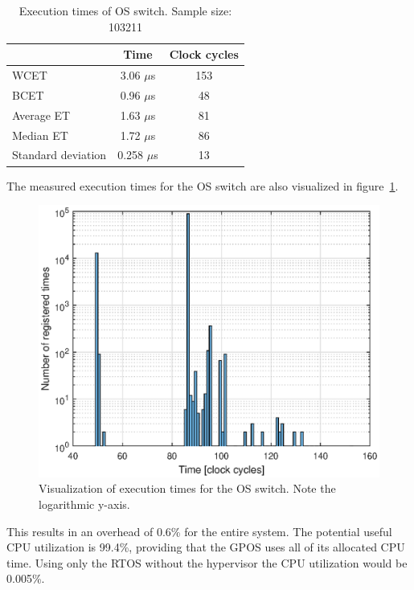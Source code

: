 \begin{table}[H]
\centering
\begin{tabular}{|l|c|c|}
\hline
 & Time & Clock cycles \\ \hline
WCET & 3.06 $\mu$s & 153 \\ \hline
BCET & 0.96 $\mu$s & 48 \\ \hline
Average ET & 1.63 $\mu$s & 81 \\ \hline
Median ET & 1.72 $\mu$s & 86 \\ \hline
Standard deviation & 0.258 $\mu$s & 13 \\ \hline
\end{tabular}
\caption{Execution times of OS switch. Sample size: 103211}
\label{table:switch_et}
\end{table}

The measured execution times for the OS switch are also visualized in figure~\ref{fig:switch_et}.

\begin{figure}[H]
\centering
\includegraphics[width=\textwidth]{./img/results_switch_et.eps}
\caption{Visualization of execution times for the OS switch. Note the logarithmic y-axis.}\label{fig:switch_et}
\end{figure}

This results in an overhead of 0.6\% for the entire system. The potential useful CPU utilization is 99.4\%, providing that the GPOS uses all of its allocated CPU time. Using only the RTOS without the hypervisor the CPU utilization would be 0.005\%.\\

